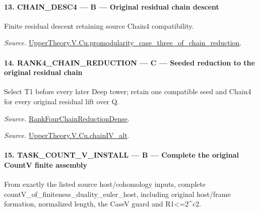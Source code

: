 \paragraph{13. CHAIN\_\allowbreak DESC4 — B — Original residual chain descent}

Finite residual descent retaining source Chain4 compatibility.

\emph{Source.} \href{https://github.com/CocoSgt/riemann-hypothesis-lean/blob/7cbf7a0c32fca1badf05931879a37c3f8a2b03b4/src/Development/AutomorphicArithmetic/AutomorphicVarieties/ModularityArgument/ThresholdArguments/DenseThresholdCases/PromodularityCaseThreeOfLemmas.lean#L131-L153}{UpperTheory.V.Cu.promodularity\_\allowbreak case\_\allowbreak three\_\allowbreak of\_\allowbreak chain\_\allowbreak reduction}.



\paragraph{14. RANK4\_\allowbreak CHAIN\_\allowbreak REDUCTION — C — Seeded reduction to the original residual chain}

Select T1 before every later Deep tower; retain one compatible seed and Chain4 for every original residual lift over Q.

\emph{Source.} \href{https://github.com/CocoSgt/riemann-hypothesis-lean/blob/7cbf7a0c32fca1badf05931879a37c3f8a2b03b4/src/Development/AutomorphicArithmetic/AutomorphicVarieties/ModularityArgument/ThresholdArguments/DenseThresholdCases/PromodularityCaseThree.lean#L33-L39}{RankFourChainReductionDense}.

\emph{Source.} \href{https://github.com/CocoSgt/riemann-hypothesis-lean/blob/7cbf7a0c32fca1badf05931879a37c3f8a2b03b4/src/Development/AutomorphicArithmetic/AutomorphicVarieties/ModularityArgument/ThresholdArguments/DenseThresholdCases/CuPChainIV.lean#L16-L82}{UpperTheory.V.Cu.chainIV\_\allowbreak alt}.



\paragraph{15. TASK\_\allowbreak COUNT\_\allowbreak V\_\allowbreak INSTALL — B — Complete the original CountV finite assembly}

From exactly the listed source host/cohomology inputs, complete countV\_\allowbreak of\_\allowbreak finiteness\_\allowbreak duality\_\allowbreak euler\_\allowbreak host, including original host/frame formation, normalized length, the CaseV guard and R1<=2\textasciicircum{}c2.

